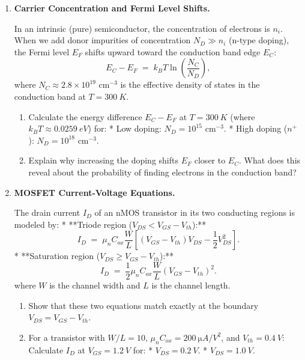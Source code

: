 \documentclass[12pt, a4paper]{book}
\begin{document}
\begin{problembox}
\begin{enumerate}[label=\textbf{P\arabic*.}]
  \item \textbf{Carrier Concentration and Fermi Level Shifts.}
  
        In an intrinsic (pure) semiconductor, the concentration of electrons is $n_i$. When we add donor impurities of concentration $N_D \gg n_i$ (n-type doping), the Fermi level $E_F$ shifts upward toward the conduction band edge $E_C$:
        \[
          E_C - E_F \;=\; k_B T \ln\left( \frac{N_C}{N_D} \right),
        \]
        where $N_C \approx 2.8 \times 10^{19}$ cm$^{-3}$ is the effective density of states in the conduction band at $T = \SI{300}{K}$.
        \begin{enumerate}[label=(\alph*)]
          \item Calculate the energy difference $E_C - E_F$ at $T = \SI{300}{K}$ (where $k_B T \approx \SI{0.0259}{eV}$) for:
                * Low doping: $N_D = 10^{15}$ cm$^{-3}$.
                * High doping ($n^+$): $N_D = 10^{18}$ cm$^{-3}$.
          \item Explain why increasing the doping shifts $E_F$ closer to $E_C$. What does this reveal about the probability of finding electrons in the conduction band?
        \end{enumerate}

  \item \textbf{MOSFET Current-Voltage Equations.}
  
        The drain current $I_D$ of an nMOS transistor in its two conducting regions is modeled by:
        * **Triode region ($V_{DS} < V_{GS} - V_{th}$):**
          \[
            I_D \;=\; \mu_n C_{ox} \frac{W}{L} \left[ (V_{GS} - V_{th}) V_{DS} - \frac{1}{2} V_{DS}^2 \right].
          \]
        * **Saturation region ($V_{DS} \ge V_{GS} - V_{th}$):**
          \[
            I_D \;=\; \frac{1}{2} \mu_n C_{ox} \frac{W}{L} (V_{GS} - V_{th})^2.
          \]
        where $W$ is the channel width and $L$ is the channel length.
        \begin{enumerate}[label=(\alph*)]
          \item Show that these two equations match exactly at the boundary $V_{DS} = V_{GS} - V_{th}$.
          \item For a transistor with $W/L = 10$, $\mu_n C_{ox} = \SI{200}{\micro A/V^2}$, and $V_{th} = \SI{0.4}{V}$:
                Calculate $I_D$ at $V_{GS} = \SI{1.2}{V}$ for:
                * $V_{DS} = \SI{0.2}{V}$.
                * $V_{DS} = \SI{1.0}{V}$.
        \end{enumerate}
\end{enumerate}
\end{problembox}
\end{document}
